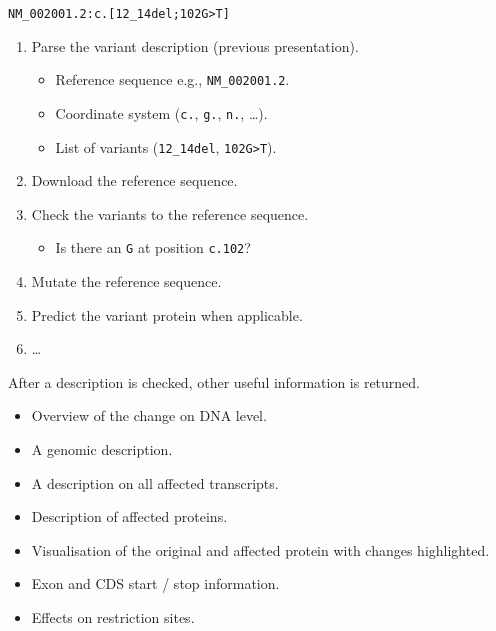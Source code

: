 \documentclass[a4, portrait]{seminar}
\begin{document}
\begin{slide}

  \begin{center}
    \texttt{NM\_002001.2:c.[12\_14del;102\yellow G\white >\yellow T\white]}
  \end{center}
  \begin{enumerate}
    \item Parse the variant description (previous presentation).
    \begin{itemize}
      \item Reference sequence e.g., \texttt{NM\_002001.2}.
      \item Coordinate system (\texttt{c.}, \texttt{g.}, \texttt{n.}, \ldots).
      \item List of variants (\texttt{12\_14del}, 
            \texttt{102\yellow G\white >\yellow T\white}).
    \end{itemize}
    \item Download the reference sequence.
    \item Check the variants to the reference sequence.
    \begin{itemize}
      \item Is there an \texttt{G} at position \texttt{c.102}?
    \end{itemize}
    \item Mutate the reference sequence.
    \item Predict the variant protein when applicable.
    \item \ldots
  \end{enumerate}
  \vfill
\end{slide}
  
\begin{slide}

  After a description is checked, other useful information is returned.
  \begin{itemize}
    \item Overview of the change on DNA level.
    \item A genomic description.
    \item A description on all affected transcripts.
    \item Description of affected proteins.
    \item Visualisation of the original and affected protein with changes 
          highlighted.
    \item Exon and CDS start / stop information.
    \item Effects on restriction sites.
  \end{itemize}

  \vfill
\end{slide}
\end{document}
